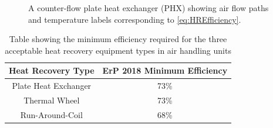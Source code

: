 \begin{figure}
\centering

\caption{A counter-flow plate heat exchanger (PHX) showing air flow paths and temperature labels corresponding to \autoref{eq:HREfficiency}.}
\label{fig:PHXWithLabels}
\end{figure}

\begin{table}
\centering
\begin{tabular}{cc}
\hline
Heat Recovery Type & ErP 2018 Minimum Efficiency\\
\hline
Plate Heat Exchanger & 73\%\\
Thermal Wheel & 73\%\\
Run-Around-Coil & 68\%\\
\hline
\end{tabular}
\caption{Table showing the minimum efficiency required for the three acceptable heat recovery equipment types in air handling units}
\label{tab:HREff}
\end{table}


